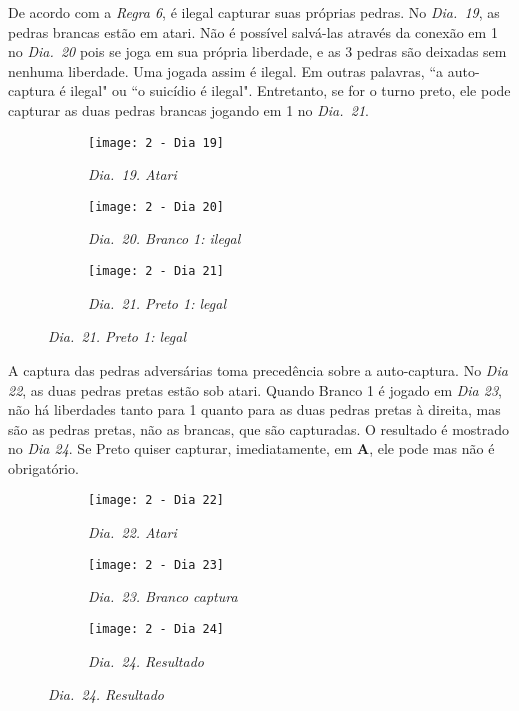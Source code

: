 De acordo com a \emph{Regra 6}, é ilegal capturar suas próprias pedras. No \emph{Dia.\@~19}, as pedras brancas estão em atari. Não é possível salvá-las através da conexão em 1 no \emph{Dia.\@~20} pois se joga em sua própria liberdade, e as 3 pedras são deixadas sem nenhuma liberdade. Uma jogada assim é ilegal. Em outras palavras, ``a auto-captura é ilegal"  ou ``o suicídio é ilegal". Entretanto, se for o turno preto, ele pode capturar as duas pedras brancas jogando em 1 no \emph{Dia.\@~21}.

\begin{figure}[h]
    \centering
    \begin{subfigure}[t]{.3\textwidth}
        \centering
        \texttt{[image: 2 - Dia 19]}
        \caption*{\emph{Dia.\@~19. Atari}}
    \end{subfigure}
    \hfill
    \begin{subfigure}[t]{.3\textwidth}
        \centering
        \texttt{[image: 2 - Dia 20]}
        \caption*{\emph{Dia.\@~20. Branco 1: ilegal}}
    \end{subfigure}
    \hfill
    \begin{subfigure}[t]{.3\textwidth}
        \centering
        \texttt{[image: 2 - Dia 21]}
        \caption*{\emph{Dia.\@~21. Preto 1: legal}}
    \end{subfigure}
\end{figure}

\pagebreak

A captura das pedras adversárias toma precedência sobre a auto-captura. No \emph{Dia 22}, as duas pedras pretas estão sob atari. Quando Branco 1 é jogado em \emph{Dia 23}, não há liberdades tanto para 1 quanto para as duas pedras pretas à direita, mas são as pedras pretas, não as brancas, que são capturadas. O resultado é mostrado no \emph{Dia 24}. Se Preto quiser capturar, imediatamente, em \textbf{A}, ele pode mas não é obrigatório.

\begin{figure}[h]
    \centering
    \begin{subfigure}[t]{.3\textwidth}
        \centering
        \texttt{[image: 2 - Dia 22]}
        \caption*{\emph{Dia.\@~22. Atari}}
    \end{subfigure}
    \hfill
    \begin{subfigure}[t]{.3\textwidth}
        \centering
        \texttt{[image: 2 - Dia 23]}
        \caption*{\emph{Dia.\@~23. Branco captura}}
    \end{subfigure}
    \hfill
    \begin{subfigure}[t]{.3\textwidth}
        \centering
        \texttt{[image: 2 - Dia 24]}
        \caption*{\emph{Dia.\@~24. Resultado}}
    \end{subfigure}
\end{figure}

